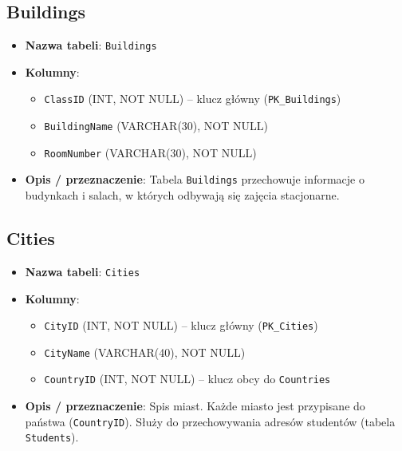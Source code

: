 \documentclass[12pt]{article}
\begin{document}
\subsection{Buildings}
\begin{itemize}
    \item \textbf{Nazwa tabeli}: \texttt{Buildings}
    \item \textbf{Kolumny}:
          \begin{itemize}
            \item \texttt{ClassID} (INT, NOT NULL) -- klucz główny (\texttt{PK\_Buildings})
            \item \texttt{BuildingName} (VARCHAR(30), NOT NULL)
            \item \texttt{RoomNumber} (VARCHAR(30), NOT NULL)
          \end{itemize}
    \item \textbf{Opis / przeznaczenie}:  
         Tabela \texttt{Buildings} przechowuje informacje o budynkach i salach, w których odbywają się zajęcia stacjonarne.
\end{itemize}

\subsection{Cities}
\begin{itemize}
    \item \textbf{Nazwa tabeli}: \texttt{Cities}
    \item \textbf{Kolumny}:
          \begin{itemize}
            \item \texttt{CityID} (INT, NOT NULL) -- klucz główny (\texttt{PK\_Cities})
            \item \texttt{CityName} (VARCHAR(40), NOT NULL)
            \item \texttt{CountryID} (INT, NOT NULL) -- klucz obcy do \texttt{Countries}
          \end{itemize}
    \item \textbf{Opis / przeznaczenie}:  
          Spis miast. Każde miasto jest przypisane do państwa (\texttt{CountryID}).  
          Służy do przechowywania adresów studentów (tabela \texttt{Students}).
\end{itemize}
\end{document}
